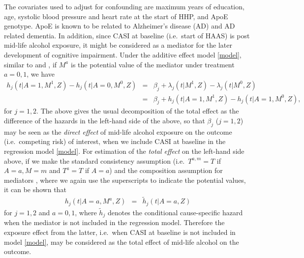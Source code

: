\documentclass[11pt]{article}
\newcommand{\eqnn}{\begin{eqnarray*}}
\newcommand{\een}{\end{eqnarray*}}
\begin{document}
The  covariates used to adjust for confounding are maximum years of education,  age, systolic blood pressure and heart rate at the start of HHP,  and ApoE genotype. ApoE is known to be related to Alzheimer's disease (AD) and AD related dementia. 
In addition, since CASI at baseline (i.e.~start of HAAS) is post mid-life alcohol exposure, it might be considered as a mediator for the later development of cognitive impairment. 
Under the additive effect model \eqref{model}, similar to \cite{lange2011direct} and \cite{vanderweele2011causal}, 
 if  $M^a$ is the potential value of the mediator  under treatment $a=0,1$, we have
\eqnn
h_j(t | A=1,M^1,Z)- h_j(t | A=0,M^0,Z)&=&\beta_j +\lambda_j(t | M^1,Z)-\lambda_j(t | M^0,Z)\\
&=&\beta_j +h_j(t | A=1,M^1,Z)-h_j(t | A=1,M^0,Z),
\een
for $j=1,2$. 
The above gives  the usual decomposition of the total effect as the difference of the hazards in the left-hand side of the above, so that 
$\beta_j$ ($j=1,2$) may be seen as the {\it direct effect} of  mid-life alcohol exposure on the outcome (i.e.~competing risk) of interest, when we include CASI at baseline in the regression model \eqref{model}. 
For estimation of the {\it total effect}  on the left-hand side above, if we make the standard consistency assumption (i.e.~$T^{a,m}=T$ if $A=a,M=m$ and $T^a=T$ if $A=a$) and the composition assumption for mediators \cite[i.e.~$T^{a,M^a}=T^a$]{vanderweele2009conceptual}, where we again use the superscripts to indicate the potential values, 
it can be shown that %
\eqnn
h_j(t | A=a,M^a,Z) %
&=&\tilde h_j(t | A=a,Z) %
\een
for $j=1,2$ and $a=0, 1$, where $\tilde h_j $ denotes the conditional  cause-specific hazard when the mediator is not included in the regression model. Therefore the exposure effect from the latter, i.e.~when CASI at baseline is not included in model \eqref{model}, may be considered as the total effect of mid-life alcohol on the outcome.
\end{document}
